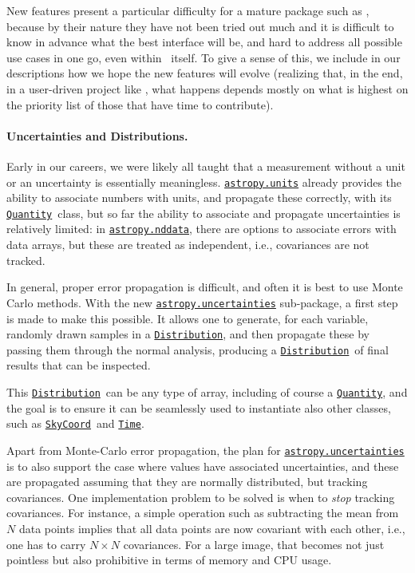 \documentclass[modern]{aastex631}
\newcommand{\astropysubpkg}[1]{\href{http://docs.astropy.org/en/stable/#1/index.html}{\texttt{astropy.#1}}\xspace}
\newcommand{\astropyunits}{\astropysubpkg{units}}
\newcommand{\astropyapi}[2]{\href{https://docs.astropy.org/en/stable/api/astropy.#1.html}{#2}}
\newcommand{\astropyapidoc}[2]{\astropyapi{#1}{\texttt{#2}\xspace}}
\newcommand{\astropySkyCoord}{\astropyapidoc{coordinates.SkyCoord}{SkyCoord}}
\newcommand{\astropyTime}{\astropyapidoc{time.Time}{Time}}
\newcommand{\astropyDistribution}{\astropyapidoc{uncertainty.Distribution}{Distribution}}
\newcommand{\astropyQuantity}{\astropyapidoc{units.Quantity}{Quantity}}
\begin{document}
New features present a particular difficulty for a mature package such
as \astropypkg, because by their nature they have not been tried out
much and it is difficult to know in advance what the best interface
will be, and hard to address all possible use cases in one go, even
within \astropypkg\ itself.  To give a sense of this, we include in
our descriptions how we hope the new features will evolve (realizing
that, in the end, in a user-driven project like \astropy, what happens
depends mostly on what is highest on the priority list of those that
have time to contribute).

\paragraph{Uncertainties and Distributions.} Early in our careers, we
were likely all taught that a measurement without a unit or an
uncertainty is essentially meaningless.  \astropyunits already
provides the ability to associate numbers with units, and propagate
these correctly, with its \astropyQuantity\ class, but so far the
ability to associate and propagate uncertainties is relatively
limited: in \astropysubpkg{nddata}, there are options to associate
errors with data arrays, but these are treated as independent, i.e.,
covariances are not tracked.

In general, proper error propagation is difficult, and often it is
best to use Monte Carlo methods.  With the new
\astropysubpkg{uncertainties} sub-package, a first step is made to
make this possible.  It allows one to generate, for each variable,
randomly drawn samples in a \astropyDistribution, and then propagate
these by passing them through the normal analysis, producing a
\astropyDistribution\ of final results that can be inspected.

This \astropyDistribution\ can be any type of array, including of
course a \astropyQuantity, and the goal is to ensure it can be
seamlessly used to instantiate also other \astropypkg classes, such as
\astropySkyCoord\ and \astropyTime.

Apart from Monte-Carlo error propagation, the plan for
\astropysubpkg{uncertainties} is to also support the case where values
have associated uncertainties, and these are propagated assuming that
they are normally distributed, but tracking covariances.  One
implementation problem to be solved is when to {\em stop} tracking
covariances.  For instance, a simple operation such as subtracting the
mean from $N$ data points implies that all data points are now
covariant with each other, i.e., one has to carry $N\times N$
covariances.  For a large image, that becomes not just pointless but
also prohibitive in terms of memory and CPU usage.
\end{document}
